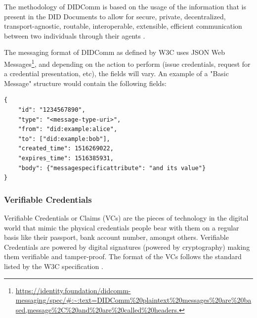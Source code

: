 The methodology of DIDComm is based on the usage of the information that is present in the DID Documents to allow for secure,
private, decentralized, transport-agnostic, routable, interoperable, extensible, efficient communication between two individuals through their agents \cite{SovrinIotSSI}. 

The messaging format of DIDComm as defined by W3C uses JSON Web Messages\footnote{\url{https://identity.foundation/didcomm-messaging/spec/\#:~:text=DIDComm\%20plaintext\%20messages\%20are\%20based,message\%2C\%20and\%20are\%20called\%20headers.}}, and depending on the action to perform (issue credentials, request for a credential presentation, etc), the fields will vary. An example of a "Basic Message" structure would contain the following fields:

\begin{verbatim}
{   
    "id": "1234567890",
    "type": "<message-type-uri>",
    "from": "did:example:alice",
    "to": ["did:example:bob"],
    "created_time": 1516269022,
    "expires_time": 1516385931,
    "body": {"messagespecificattribute": "and its value"}
}
\end{verbatim}

\subsubsection{Verifiable Credentials}
\label{subsubsec:VCs}

Verifiable Credentials or Claims (VCs) are the pieces of technology in the digital world that mimic the physical credentials people bear with them on a regular basis like their passport, bank account number, amongst others. Verifiable Credentials are powered by digital signatures (powered by cryptography) making them verifiable and tamper-proof. The format of the VCs follows the standard listed by the W3C specification \cite{Sabadello:21:VCs}.

